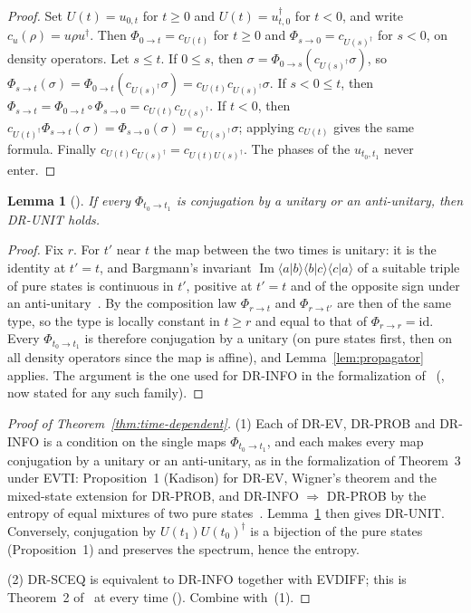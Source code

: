 \documentclass[11pt]{article}
\newtheorem{lemma}[theorem]{Lemma}
\theoremstyle{definition}
\begin{document}
\begin{proof}
  Set $U(t) = u_{0,t}$ for $t \ge 0$ and $U(t) = u_{t,0}^\dagger$ for $t < 0$, and write
  $c_u(\rho) = u\rho u^\dagger$. Then $\Phi_{0\to t} = c_{U(t)}$ for $t \ge 0$ and
  $\Phi_{s\to 0} = c_{U(s)^\dagger}$ for $s < 0$, on density operators. Let $s \le t$. If
  $0 \le s$, then $\sigma = \Phi_{0\to s}(c_{U(s)^\dagger}\sigma)$, so
  $\Phi_{s\to t}(\sigma) = \Phi_{0\to t}(c_{U(s)^\dagger}\sigma) = c_{U(t)}c_{U(s)^\dagger}\sigma$.
  If $s < 0 \le t$, then $\Phi_{s\to t} = \Phi_{0\to t}\circ\Phi_{s\to 0} =
  c_{U(t)}c_{U(s)^\dagger}$. If $t < 0$, then $c_{U(t)^\dagger}\Phi_{s\to t}(\sigma) =
  \Phi_{s\to 0}(\sigma) = c_{U(s)^\dagger}\sigma$; applying $c_{U(t)}$ gives the same formula.
  Finally $c_{U(t)}c_{U(s)^\dagger} = c_{U(t)U(s)^\dagger}$. The phases of the $u_{t_0,t_1}$
  never enter.
\end{proof}

\begin{lemma}[]
  \label{lem:antiunitary}
  If every $\Phi_{t_0\to t_1}$ is conjugation by a unitary or an anti-unitary, then DR-UNIT holds.
\end{lemma}

\begin{proof}
  Fix $r$. For $t'$ near $t$ the map between the two times is unitary: it is the identity at
  $t' = t$, and Bargmann's invariant $\operatorname{Im}\langle a|b\rangle\langle b|c\rangle\langle
  c|a\rangle$ of a suitable triple of pure states is continuous in $t'$, positive at $t' = t$ and
  of the opposite sign under an anti-unitary~\cite{bargmann}. By the composition law
  $\Phi_{r\to t}$ and $\Phi_{r\to t'}$ are then of the same type, so the type is locally
  constant in $t \ge r$ and equal to that of $\Phi_{r\to r} = \mathrm{id}$. Every
  $\Phi_{t_0\to t_1}$ is therefore conjugation by a unitary (on pure states first, then on all
  density operators since the map is affine), and Lemma~\ref{lem:propagator} applies.
  The argument is the one used for DR-INFO in the formalization of~\cite{info}
  (, now stated for any such family).
\end{proof}

\begin{proof}[Proof of Theorem~\ref{thm:time-dependent}]
  (1) Each of DR-EV, DR-PROB and DR-INFO is a condition on the single maps
  $\Phi_{t_0\to t_1}$, and each makes every map conjugation by a unitary or an anti-unitary, as in
  the formalization of Theorem~3 under EVTI: Proposition~1 (Kadison) for DR-EV, Wigner's theorem
  and the mixed-state extension for DR-PROB, and DR-INFO $\Rightarrow$ DR-PROB by the entropy of
  equal mixtures of two pure states~\cite{info}. Lemma~\ref{lem:antiunitary} then gives DR-UNIT. Conversely,
  conjugation by $U(t_1)U(t_0)^\dagger$ is a bijection of the pure states (Proposition~1) and
  preserves the spectrum, hence the entropy.

  (2) DR-SCEQ is equivalent to DR-INFO together with EVDIFF; this is Theorem~2
  of~\cite{info} at every time ().
  Combine with~(1).
\end{proof}
\end{document}
